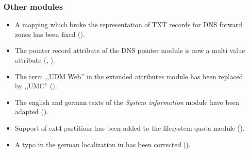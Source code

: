 



\subsubsection{Other modules}
\begin{itemize}
\item A mapping which broke the representation of TXT records for DNS forward
  zones has been fixed ().
\item The pointer record attribute of the DNS pointer module is now a multi
value attribute (, ).
\item The term ,,UDM Web'' in the extended attributes module has been replaced
  by ,,UMC'' ().
\item The english and german texts of the \emph{System information}
  module have been adapted ().
\item Support of ext4 partitions has been added to the filesystem quota module
  ().
\item A typo in the german localization in
   has been corrected
  ().
\end{itemize}

